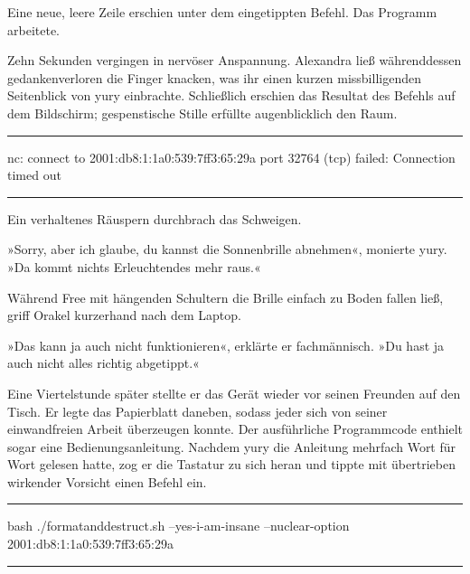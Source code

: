 
Eine neue, leere Zeile erschien unter dem eingetippten Befehl. Das Programm arbeitete.

Zehn Sekunden vergingen in nervöser Anspannung. Alexandra ließ währenddessen gedankenverloren die Finger knacken, was ihr einen kurzen missbilligenden Seitenblick von yury einbrachte. Schließlich erschien das Resultat des Befehls auf dem Bildschirm; gespenstische Stille erfüllte augenblicklich den Raum.

\noindent \parbox{\textwidth}{ \vspace{3ex} \hrule \vspace{3ex}

    \begin{tiny}
    \begin{ttfamily}

\noindent nc: connect to 2001:db8:1:1a0:539:7ff3:65:29a port 32764 (tcp) failed: Connection timed out

    \end{ttfamily}
    \end{tiny}

\vspace{3ex} \hrule \vspace{3ex} }

Ein verhaltenes Räuspern durchbrach das Schweigen.

»Sorry, aber ich glaube, du kannst die Sonnenbrille abnehmen«, monierte yury. »Da kommt nichts Erleuchtendes mehr raus.«

Während Free mit hängenden Schultern die Brille einfach zu Boden fallen ließ, griff Orakel kurzerhand nach dem Laptop.

»Das kann ja auch nicht funktionieren«, erklärte er fachmännisch. »Du hast ja auch nicht alles richtig abgetippt.«

Eine Viertelstunde später stellte er das Gerät wieder vor seinen Freunden auf den Tisch. Er legte das Papierblatt daneben, sodass jeder sich von seiner einwandfreien Arbeit überzeugen konnte. Der ausführliche Programmcode enthielt sogar eine Bedienungsanleitung. Nachdem yury die Anleitung mehrfach Wort für Wort gelesen hatte, zog er die Tastatur zu sich heran und tippte mit übertrieben wirkender Vorsicht einen Befehl ein.

\noindent \parbox{\textwidth}{ \vspace{3ex} \hrule \vspace{3ex}

    \begin{tiny}
    \begin{ttfamily}

\noindent bash ./formatanddestruct.sh --yes-i-am-insane --nuclear-option 2001:db8:1:1a0:539:7ff3:65:29a

    \end{ttfamily}
    \end{tiny}

\vspace{3ex} \hrule \vspace{3ex} }

